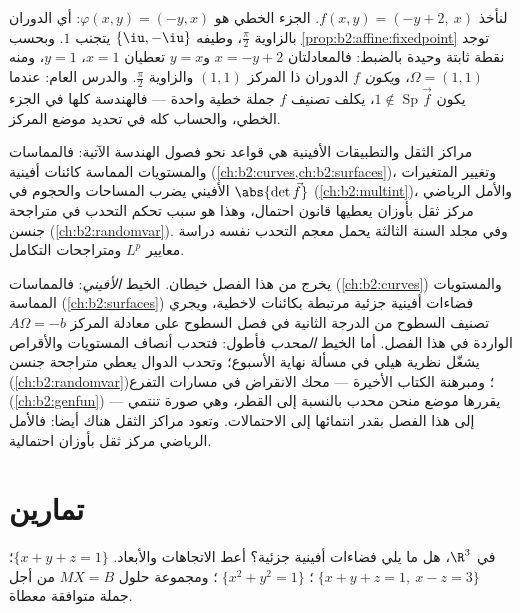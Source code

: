 \begin{example}\label{ex:b2:affine:rotationcenter}
لنأخذ $f(x, y) = (-y + 2,\ x)$. الجزء الخطي هو $\varphi(x, y) = (-y, x)$: أي الدوران بالزاوية $\frac\pi2$،
وطيفه $\{\iu, -\iu\}$ يتجنب $1$. وبحسب \cref{prop:b2:affine:fixedpoint} توجد نقطة ثابتة وحيدة
بالضبط: فالمعادلتان $x = -y + 2$ و$y = x$ تعطيان $x = 1$، $y = 1$، ومنه
$\Omega = (1, 1)$، و\emph{يكون} $f$ الدوران ذا المركز $(1, 1)$ والزاوية
$\frac\pi2$. والدرس العام: عندما يكون $1
\notin \operatorname{Sp}\vec f$، يكلف تصنيف $f$ جملة
خطية واحدة --- فالهندسة كلها في الجزء الخطي، والحساب كله في تحديد
موضع المركز.
\end{example}

\begin{remark}
مراكز الثقل والتطبيقات الأفينية هي قواعد نحو فصول الهندسة الآتية:
فالمماسات والمستويات المماسة كائنات أفينية (\cref{ch:b2:curves,ch:b2:surfaces})، وتغيير المتغيرات
الأفيني يضرب المساحات والحجوم في $\abs{\det \vec f}$ (\cref{ch:b2:multint})، والأمل الرياضي
مركز ثقل بأوزان يعطيها قانون احتمال، وهذا هو سبب تحكم التحدب في
متراجحة جنسن (\cref{ch:b2:randomvar}). وفي مجلد السنة الثالثة يحمل معجم التحدب نفسه
دراسة معايير $L^p$ ومتراجحات التكامل.
\end{remark}

\begin{remark}
يخرج من هذا الفصل خيطان. الخيط \emph{الأفيني}: فالمماسات (\cref{ch:b2:curves})
والمستويات المماسة (\cref{ch:b2:surfaces}) فضاءات أفينية جزئية مرتبطة بكائنات
لاخطية، ويجري تصنيف السطوح من الدرجة الثانية في فصل السطوح على
معادلة المركز $A\Omega = -b$ الواردة في هذا الفصل. أما الخيط \emph{المحدب}
فأطول: فتحدب أنصاف المستويات والأقراص يشغّل نظرية هيلي في مسألة
نهاية الأسبوع؛ وتحدب الدوال يعطي متراجحة جنسن (\cref{ch:b2:randomvar})؛ ومبرهنة
الكتاب الأخيرة --- محك الانقراض في مسارات التفرع (\cref{ch:b2:genfun}) ---
يقررها موضع منحن محدب بالنسبة إلى القطر، وهي صورة تنتمي إلى هذا
الفصل بقدر انتمائها إلى الاحتمالات. وتعود مراكز الثقل هناك أيضا:
فالأمل الرياضي مركز ثقل بأوزان احتمالية.
\end{remark}

\section{تمارين}

\begin{exercise}[$\star$]\label{exo:b2:affine:1}
في $\R^3$، هل ما يلي فضاءات أفينية جزئية؟ أعط الاتجاهات والأبعاد.
$\{x + y + z = 1\}$؛ $\;\{x + y + z = 1,\ x - z =
3\}$؛ $\;\{x^2 + y^2 = 1\}$؛ ومجموعة حلول $MX = B$ من أجل جملة متوافقة
معطاة.
\end{exercise}

